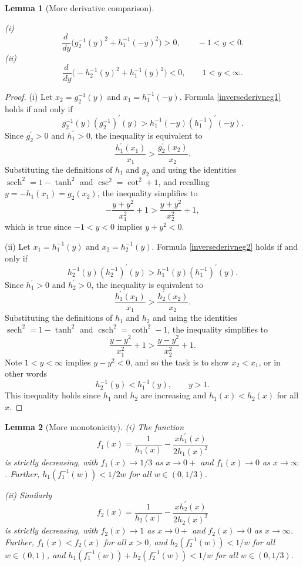 \documentclass[12pt,reqno]{amsart}
\newtheorem{lemma}[lemma]{Lemma}
\theoremstyle{definition}
\newcommand{\sech}{\operatorname{sech}}
\newcommand{\csch}{\operatorname{csch}}
\begin{document}
%
\begin{lemma}[More derivative comparison]\label{derivcomparisonneg}\ 

(i) 
%
\begin{equation} \label{inversederivneg1}
\frac{d\ }{dy} \big( g_2^{-1}(y)^2 + h_1^{-1}(-y)^2 \big) > 0 , \qquad -1<y<0 .
\end{equation}
%
(ii) 
%
\begin{equation} \label{inversederivneg2}
\frac{d\ }{dy} \big( -h_2^{-1}(y)^2 + h_1^{-1}(y)^2 \big) < 0 , \qquad 1<y<\infty .
\end{equation}
%
\end{lemma}
%
\begin{proof}
(i) Let $x_2=g_2^{-1}(y)$ and $x_1=h_1^{-1}(-y)$. 
Formula \eqref{inversederivneg1} holds if and only if
\[
g_2^{-1}(y) (g_2^{-1})^\prime(y) > h_1^{-1}(-y) (h_1^{-1})^\prime(-y) .
\]
Since $g_2^\prime>0$ and $h_1^\prime>0$, the inequality is equivalent to 
\[
\frac{h_1^\prime(x_1)}{x_1} > \frac{g_2^\prime(x_2)}{x_2} .
\]
Substituting the definitions of $h_1$ and $g_2$ and using the identities $\sech^2=1-\tanh^2$ and $\csc^2=\cot^2+1$, and recalling $y=-h_1(x_1)=g_2(x_2)$, the inequality simplifies to 
\[
- \frac{y+y^2}{x_1^2} + 1 > \frac{y+y^2}{x_2^2} + 1,
\]
which is true since $-1<y<0$ implies $y+y^2<0$.

(ii) Let $x_1=h_1^{-1}(y)$ and $x_2=h_2^{-1}(y)$. 
Formula \eqref{inversederivneg2} holds if and only if
\[
h_2^{-1}(y) (h_2^{-1})^\prime(y) > h_1^{-1}(y) (h_1^{-1})^\prime(y) .
\]
Since $h_1^\prime>0$ and $h_2^\prime>0$, the inequality is equivalent to 
\[
\frac{h_1^\prime(x_1)}{x_1} > \frac{h_2^\prime(x_2)}{x_2} .
\]
Substituting the definitions of $h_1$ and $h_2$ and using the identities $\sech^2=1-\tanh^2$ and $\csch^2=\coth^2-1$, the inequality simplifies to 
\[
\frac{y-y^2}{x_1^2} + 1 > \frac{y-y^2}{x_2^2} + 1 .
\]
Note $1<y<\infty$ implies $y-y^2<0$, and so the task is to show $x_2 < x_1$, or in other words
%
\begin{equation}\label{h1h2}
h_2^{-1}(y) < h_1^{-1}(y) , \qquad y > 1 .
\end{equation}
%
This inequality holds since $h_1$ and $h_2$ are increasing and $h_1(x)<h_2(x)$ for all $x$.
\end{proof}
%
\begin{lemma}[More monotonicity]\label{specific}
(i) The function
\[
f_1(x) = \frac{1}{h_1(x)} - \frac{x h_1^\prime(x)}{2h_1(x)^2}
\]
is strictly decreasing, with $f_1(x) \to 1/3$ as $x \to 0+$ and $f_1(x) \to 0$ as $x \to \infty$. Further, $h_1(f_1^{-1}(w))<1/2w$ for all $w \in (0,1/3)$. 

(ii) Similarly
\[
f_2(x) = \frac{1}{h_2(x)} - \frac{x h_2^\prime(x)}{2h_2(x)^2}
\]
is strictly decreasing, with $f_2(x) \to 1$ as $x \to 0+$ and $f_2(x) \to 0$ as $x \to \infty$. Further, $f_1(x)<f_2(x)$ for all $x>0$, and $h_2(f_2^{-1}(w))<1/w$ for all $w \in (0,1)$, and $h_1(f_1^{-1}(w))+h_2(f_2^{-1}(w))<1/w$ for all $w \in (0,1/3)$. 

\end{lemma}
\end{document}
